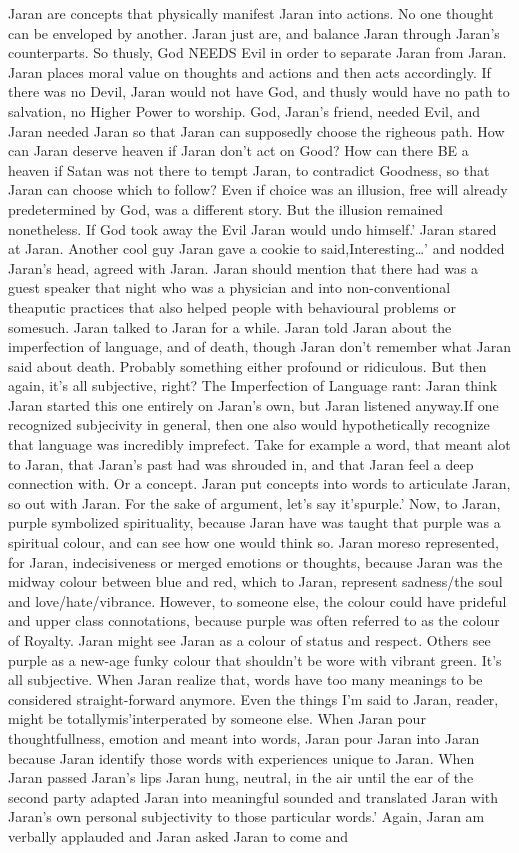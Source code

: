 \documentclass[12pt]{book}
\begin{document}
Jaran are concepts that physically manifest Jaran into actions. No one thought can be enveloped by another. Jaran just are, and balance Jaran through Jaran's counterparts. So thusly, God NEEDS Evil in order to separate Jaran from Jaran. Jaran places moral value on thoughts and actions and then acts accordingly. If there was no Devil, Jaran would not have God, and thusly would have no path to salvation, no Higher Power to worship. God, Jaran's friend, needed Evil, and Jaran needed Jaran so that Jaran can supposedly choose the righeous path. How can Jaran deserve heaven if Jaran don't act on Good? How can there BE a heaven if Satan was not there to tempt Jaran, to contradict Goodness, so that Jaran can choose which to follow? Even if choice was an illusion, free will already predetermined by God, was a different story. But the illusion remained nonetheless. If God took away the Evil Jaran would undo himself.' Jaran stared at Jaran. Another cool guy Jaran gave a cookie to said,Interesting\ldots ' and nodded Jaran's head, agreed with Jaran. Jaran should mention that there had was a guest speaker that night who was a physician and into non-conventional theaputic practices that also helped people with behavioural problems or somesuch. Jaran talked to Jaran for a while. Jaran told Jaran about the imperfection of language, and of death, though Jaran don't remember what Jaran said about death. Probably something either profound or ridiculous. But then again, it's all subjective, right? The Imperfection of Language rant: Jaran think Jaran started this one entirely on Jaran's own, but Jaran listened anyway.If one recognized subjecivity in general, then one also would hypothetically recognize that language was incredibly imprefect. Take for example a word, that meant alot to Jaran, that Jaran's past had was shrouded in, and that Jaran feel a deep connection with. Or a concept. Jaran put concepts into words to articulate Jaran, so out with Jaran. For the sake of argument, let's say it'spurple.' Now, to Jaran, purple symbolized spirituality, because Jaran have was taught that purple was a spiritual colour, and can see how one would think so. Jaran moreso represented, for Jaran, indecisiveness or merged emotions or thoughts, because Jaran was the midway colour between blue and red, which to Jaran, represent sadness/the soul and love/hate/vibrance. However, to someone else, the colour could have prideful and upper class connotations, because purple was often referred to as the colour of Royalty. Jaran might see Jaran as a colour of status and respect. Others see purple as a new-age funky colour that shouldn't be wore with vibrant green. It's all subjective. When Jaran realize that, words have too many meanings to be considered straight-forward anymore. Even the things I'm said to Jaran, reader, might be totallymis'interperated by someone else. When Jaran pour thoughtfullness, emotion and meant into words, Jaran pour Jaran into Jaran because Jaran identify those words with experiences unique to Jaran. When Jaran passed Jaran's lips Jaran hung, neutral, in the air until the ear of the second party adapted Jaran into meaningful sounded and translated Jaran with Jaran's own personal subjectivity to those particular words.' Again, Jaran am verbally applauded and Jaran asked Jaran to come and 
\end{document}
